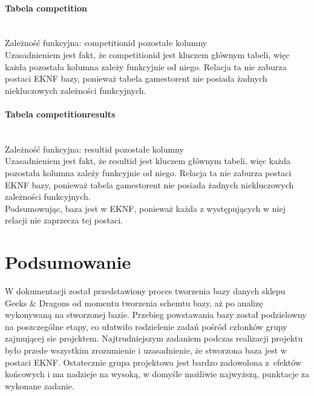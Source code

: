 \documentclass{article}
\begin{document}
	\paragraph{Tabela competition}\mbox{}\vspace{0.2cm} \\
	Zależność funkcyjna: competition\textunderscore id\mbox{} \textrightarrow \mbox{} pozostałe kolumny \vspace{0.2cm} \\
	\noindent Uzasadnieniem jest fakt, że competition\textunderscore id jest kluczem głównym tabeli, więc każda pozostała kolumna zależy funkcyjnie od niego. Relacja ta nie zaburza postaci EKNF bazy, ponieważ tabela games\textunderscore to\textunderscore rent nie posiada żadnych niekluczowych zależności funkcyjnych.
	
	\paragraph{Tabela competition\textunderscore results}\mbox{}\vspace{0.2cm} \\
	Zależność funkcyjna: result\textunderscore id\mbox{} \textrightarrow \mbox{} pozostałe kolumny \vspace{0.2cm} \\
	\noindent Uzasadnieniem jest fakt, że result\textunderscore id jest kluczem głównym tabeli, więc każda pozostała kolumna zależy funkcyjnie od niego. Relacja ta nie zaburza postaci EKNF bazy, ponieważ tabela games\textunderscore to\textunderscore rent nie posiada żadnych niekluczowych zależności funkcyjnych.\\
	
	\noindent Podsumowując, baza jest w EKNF, ponieważ każda z występujących w niej relacji nie zaprzecza tej postaci.
	
	\section{Podsumowanie}
	W dokumentacji został przedstawiony proces tworzenia bazy danych sklepu Geeks \& Dragons od momentu tworzenia schemtu bazy, aż po analizę wykonywaną na stworzonej bazie. Przebieg powstawania bazy został podzielowny na poszczególne etapy, co ułatwiło rodzielenie zadań pośród członków grupy zajmującej sie projektem. Najtrudniejszym zadaniem podczas realizacji projektu było przede wszystkim zrozumienie i uzasadnienie, że stworzona baza jest w  postaci EKNF. Ostatecznie grupa projektowa jest bardzo zadowolona z~efektów końcowych i ma nadzieje na wysoką, w domyśle możliwie najwyższą, punktacje za wykonane zadanie.
	
\end{document}
